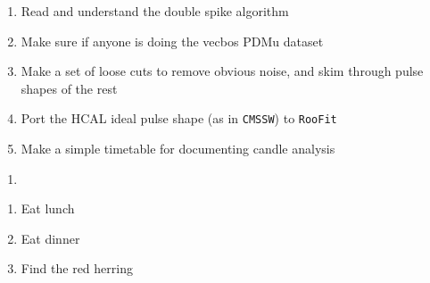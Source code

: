 

\begin{enumerate}
\item Read and understand the double spike algorithm
\item Make sure if anyone is doing the vecbos PDMu dataset
\item Make a set of loose cuts to remove obvious noise, and skim through pulse shapes of the rest
\item Port the HCAL ideal pulse shape (as in \texttt{CMSSW}) to \texttt{RooFit}
\item Make a simple timetable for documenting candle analysis
\end{enumerate}


\begin{enumerate}
\item 
\end{enumerate}






\begin{enumerate}
\item Eat lunch
\item Eat dinner
\item Find the red herring
\end{enumerate}


